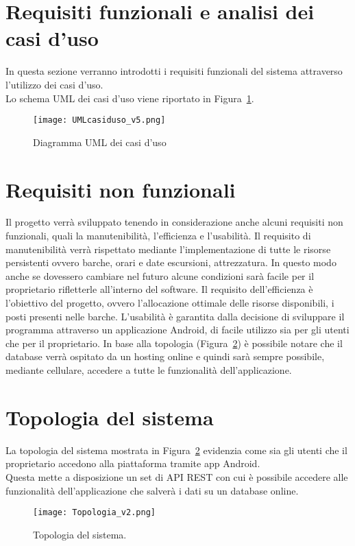 \section{Requisiti funzionali e analisi dei casi d'uso}

In questa sezione verranno introdotti i requisiti funzionali del sistema attraverso l'utilizzo dei casi d'uso.
\\Lo schema UML dei casi d'uso viene riportato in Figura~\ref{fig:casiduso}.

\begin{figure}[!ht]
    \centering
    \texttt{[image: UMLcasiduso\_v5.png]}
    \caption{Diagramma UML dei casi d'uso}\label{fig:casiduso}
\end{figure}

\section{Requisiti non funzionali}
Il progetto verrà sviluppato tenendo in considerazione anche alcuni requisiti non funzionali, quali la manutenibilità, l'efficienza e l'usabilità.
Il requisito di manutenibilità verrà rispettato mediante l'implementazione di tutte le risorse persistenti ovvero barche, orari e date escursioni, attrezzatura. In questo modo anche se dovessero cambiare nel futuro alcune condizioni sarà facile per il proprietario rifletterle all'interno del software.
Il requisito dell'efficienza è l'obiettivo del progetto, ovvero l'allocazione ottimale delle risorse disponibili, i posti presenti nelle barche.
L'usabilità è garantita dalla decisione di sviluppare il programma attraverso un applicazione Android, di facile utilizzo sia per gli utenti che per il proprietario. In base alla topologia (Figura~\ref{fig:topologia}) è possibile notare che il database verrà ospitato da un hosting online e quindi sarà sempre possibile, mediante cellulare, accedere a tutte le funzionalità dell'applicazione.

\newpage

\section{Topologia del sistema}
La topologia  del sistema mostrata in Figura~\ref{fig:topologia} evidenzia come sia gli utenti che il proprietario accedono alla piattaforma tramite app Android.
\\Questa mette a disposizione un set di API REST con cui è possibile accedere alle funzionalità dell'applicazione che salverà i dati su un database online.

\begin{figure}[hb]
    \centering
    \texttt{[image: Topologia\_v2.png]}
    \caption{Topologia del sistema.}\label{fig:topologia}
\end{figure}